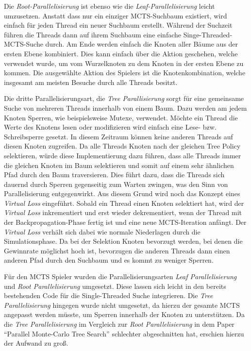 Die \emph{Root-Parallelisierung} ist ebenso wie die \emph{Leaf-Parallelisierung} leicht umzusetzen. Anstatt dass nur ein einziger \ac{MCTS}-Suchbaum existiert, wird einfach für jeden Thread ein neuer Suchbaum erstellt. Während der Suchzeit führen die Threads dann auf ihrem Suchbaum eine einfache Singe-Threaded-\ac{MCTS}-Suche durch. Am Ende werden einfach die Knoten aller Bäume aus der ersten Ebene kombiniert. Dies kann einfach über die Aktion geschehen, welche verwendet wurde, um vom Wurzelknoten zu dem Knoten in der ersten Ebene zu kommen. Die ausgewählte Aktion des Spielers ist die Knotenkombination, welche insgesamt am meisten Besuche durch alle Threads besitzt. \cite[S. 63]{2008.ParallelMCTS}

Die dritte Parallelisierungsart, die \emph{Tree Parallisierung} sorgt für eine gemeinsame Suche von mehreren Threads innerhalb von einem Baum. Dazu werden am jedem Knoten Sperren, wie beispielsweise Mutexe, verwendet. Möchte ein Thread die Werte des Knotens lesen oder modifizieren wird einfach eine Lese- bzw. Schreibsperre gesetzt. In diesem Zeitraum können keine anderen Threads auf diesen Knoten zugreifen. Da alle Threads Knoten nach der gleichen Tree Policy selektieren, würde diese Implementierung dazu führen, dass alle Threads immer die gleichen Knoten im Baum selektieren und somit auf einem sehr ähnlichen Pfad durch den Baum traversieren. Dies führt dazu, dass die Threads sich dauernd durch Sperren gegenseitig zum Warten zwingen, was den Sinn von Parallelisierung entgegenwirkt. Aus diesem Grund wird noch das Konzept eines \emph{Virtual Loss} eingeführt. Sobald ein Thread einen Knoten selektiert hat, wird der \emph{Virtual Loss} inkrementiert und erst wieder dekrementiert, wenn der Thread mit der Backpropagation-Phase fertig ist und eine neue \ac{MCTS}-Iteration anfängt. Der \emph{Virtual Loss} verhält sich dabei wie normale Niederlagen durch die Simulationsphase. Da bei der Selektion Knoten bevorzugt werden, bei denen die Gewinnrate möglichst hoch ist, bevorzugen die anderen Threads dann einen anderen Pfad durch den Suchbaum und es kommt zu weniger Sperren. \cite[S. 64]{2008.ParallelMCTS}

Für den \ac{MCTS} Spieler wurden die Parallelisierungsarten \emph{Leaf Parallelisierung} und \emph{Root Parallelisierung} umgesetzt. Diese lassen sich leicht in den bereits bestehenden Code für die Single-Threaded Suche integrieren. Die \emph{Tree Parallelisierung} hingegen wurde nicht umgesetzt, da hierzu der gesamte \ac{MCTS} angepasst werden müsste, um Sperren innerhalb der Knoten zu unterstützen. Da die \emph{Tree Parallelisierung} im Vergleich zur \emph{Root Parallelisierung} in dem Paper \enquote{Parallel Monte-Carlo Tree Search} \cite[S. 69]{2008.ParallelMCTS} schlechter abgeschnitten hat, erschien hierzu der Aufwand zu groß.

